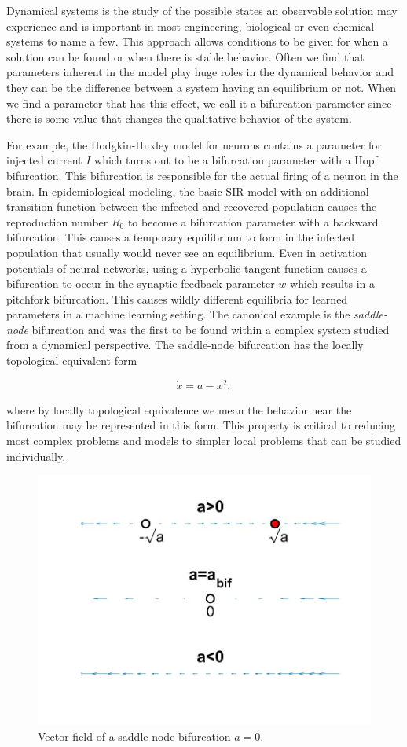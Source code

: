 Dynamical systems is the study of the possible states an observable solution may experience and is important in most engineering, biological or even chemical systems to name a few. This approach allows conditions to be given for when a solution can be found or when there is stable behavior. Often we find that parameters inherent in the model play huge roles in the dynamical behavior and they can be the difference between a system having an equilibrium or not. When we find a parameter that has this effect, we call it a bifurcation parameter since there is some value that changes the qualitative behavior of the system.

\indent For example, the Hodgkin-Huxley model for neurons contains a parameter for injected current $I$ which turns out to be a bifurcation parameter with a Hopf bifurcation. This bifurcation is responsible for the actual firing of a neuron in the brain. In epidemiological modeling, the basic SIR model with an additional transition function between the infected and recovered population causes the reproduction number $R_0$ to become a bifurcation parameter with a backward bifurcation. This causes a temporary equilibrium to form in the infected population that usually would never see an equilibrium. Even in activation potentials of neural networks, using a hyperbolic tangent function causes a bifurcation to occur in the synaptic feedback parameter $w$ which results in a pitchfork bifurcation. This causes wildly different equilibria for learned parameters in a machine learning setting. The canonical example is the \textit{saddle-node} bifurcation and was the first to be found within a complex system studied from a dynamical perspective. The saddle-node bifurcation has the locally topological equivalent form

\begin{equation}\label{eq:intro_saddlenode}
\dot{x}=a-x^2,
\end{equation}

where by locally topological equivalence we mean the behavior near the bifurcation may be represented in this form. This property is critical to reducing most complex problems and models to simpler local problems that can be studied individually.

\begin{figure}[H]
\centering
\includegraphics[width = .7\linewidth]{intro/saddlenode.jpg}
\caption{Vector field of a saddle-node bifurcation $a=0$.}
\label{fig:intro_saddlenode}
\end{figure}

